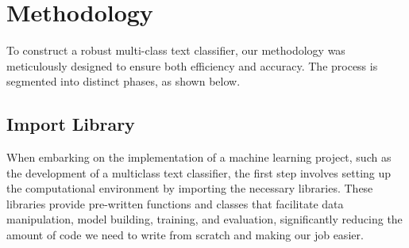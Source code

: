 \section{Methodology}

To construct a robust multi-class text classifier, our methodology was meticulously designed to ensure both efficiency and accuracy. The process is segmented into distinct phases, as shown below.

\subsection{Import Library}
When embarking on the implementation of a machine learning project, such as the development of a multiclass text classifier, the first step involves setting up the computational environment by importing the necessary libraries. These libraries provide pre-written functions and classes that facilitate data manipulation, model building, training, and evaluation, significantly reducing the amount of code we need to write from scratch and making our job easier.

